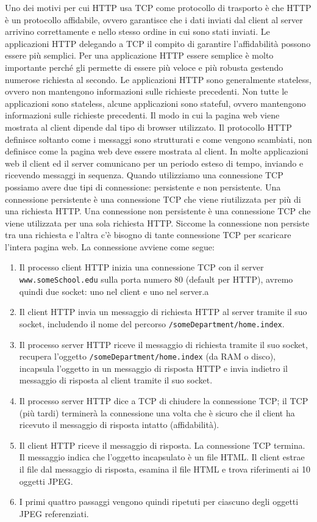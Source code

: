\documentclass[12pt]{article}
\begin{document}
Uno dei motivi per cui HTTP usa TCP come protocollo di trasporto è che HTTP è un protocollo affidabile, ovvero garantisce che i dati inviati dal client al server arrivino correttamente e nello stesso ordine in cui sono stati inviati.
Le applicazioni HTTP delegando a TCP il compito di garantire l'affidabilità possono essere più semplici.
Per una applicazione HTTP essere semplice è molto importante perché gli permette di essere più veloce e più robusta gestendo numerose richiesta al secondo.
Le applicazioni HTTP sono generalmente stateless, ovvero non mantengono informazioni sulle richieste precedenti. Non tutte le applicazioni sono stateless, alcune applicazioni sono stateful, ovvero mantengono informazioni sulle richieste precedenti.
Il modo in cui la pagina web viene mostrata al client dipende dal tipo di browser utilizzato. Il protocollo HTTP definisce soltanto come i messaggi sono strutturati e come vengono scambiati, non definisce come la pagina web deve essere mostrata al client.
In molte applicazioni web il client ed il server comunicano per un periodo esteso di tempo, inviando e ricevendo messaggi in sequenza.
Quando utilizziamo una connessione TCP possiamo avere due tipi di connessione: persistente e non persistente.
Una connessione persistente è una connessione TCP che viene riutilizzata per più di una richiesta HTTP.
Una connessione non persistente è una connessione TCP che viene utilizzata per una sola richiesta HTTP.
Siccome la connessione non persiste tra una richiesta e l'altra c'è bisogno di tante connessione TCP per scaricare l'intera pagina web.
La connessione avviene come segue:
\begin{enumerate}
    \item Il processo client HTTP inizia una connessione TCP con il server \texttt{www.someSchool.edu} sulla porta numero 80 (default per HTTP), avremo quindi due socket: uno nel client e uno nel server.a
    \item Il client HTTP invia un messaggio di richiesta HTTP al server tramite il suo socket, includendo il nome del percorso \texttt{/someDepartment/home.index}.
    \item Il processo server HTTP riceve il messaggio di richiesta tramite il suo socket, recupera l'oggetto \texttt{/someDepartment/home.index} (da RAM o disco), incapsula l'oggetto in un messaggio di risposta HTTP e invia indietro il messaggio di risposta al client tramite il suo socket.
    \item Il processo server HTTP dice a TCP di chiudere la connessione TCP; il TCP (più tardi) terminerà la connessione una volta che è sicuro che il client ha ricevuto il messaggio di risposta intatto (affidabilità).
    \item Il client HTTP riceve il messaggio di risposta. La connessione TCP termina. Il messaggio indica che l'oggetto incapsulato è un file HTML. Il client estrae il file dal messaggio di risposta, esamina il file HTML e trova riferimenti ai 10 oggetti JPEG.
    \item I primi quattro passaggi vengono quindi ripetuti per ciascuno degli oggetti JPEG referenziati.
\end{enumerate}
\end{document}
